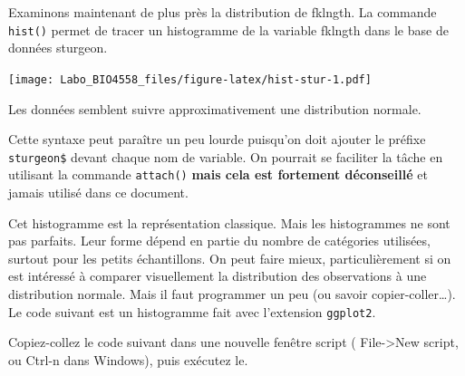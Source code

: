 \documentclass[12pt,]{book}
\makeatletter
\newenvironment{Shaded}{\begin{snugshade}}{\end{snugshade}}
\newcommand{\KeywordTok}[1]{\textcolor[rgb]{0.27,0.27,0.27}{\textbf{#1}}}
\newcommand{\NormalTok}[1]{#1}
\newcommand{\OperatorTok}[1]{\textcolor[rgb]{0.43,0.43,0.43}{\textbf{#1}}}
\newenvironment{kframe}{%
\medskip{}
\setlength{\fboxsep}{.8em}
 \def\at@end@of@kframe{}%
 \ifinner\ifhmode%
  \def\at@end@of@kframe{\end{minipage}}%
  \begin{minipage}{\columnwidth}%
 \fi\fi%
 \def\FrameCommand##1{\hskip\@totalleftmargin \hskip-\fboxsep
 \colorbox{shadecolor}{##1}\hskip-\fboxsep
     \hskip-\linewidth \hskip-\@totalleftmargin \hskip\columnwidth}%
 \MakeFramed {\advance\hsize-\width
   \@totalleftmargin\z@ \linewidth\hsize
   \@setminipage}}%
 {\par\unskip\endMakeFramed%
 \at@end@of@kframe}
\newenvironment{rmdblock}[1]
  {
  \begin{itemize}
  \renewcommand{\labelitemi}{
    \raisebox{-.7\height}[0pt][0pt]{
      {\setkeys{Gin}{width=3em,keepaspectratio}\texttt{[image: images/\#1]}}
    }
  }
  \setlength{\fboxsep}{1em}
  \begin{kframe}
  \item
  }
  {
  \end{kframe}
  \end{itemize}
  }
\newenvironment{rmdnote}
  {\begin{rmdblock}{note}}
  {\end{rmdblock}}
\newenvironment{rmdcode}
  {\begin{rmdblock}{screen}}
  {\end{rmdblock}}
\makeatother
\begin{document}
Examinons maintenant de plus près la distribution de fklngth.
La commande \texttt{hist()} permet de tracer un histogramme de la variable fklngth dans le base de données sturgeon.

\begin{Shaded}
\end{Shaded}

\texttt{[image: Labo\_BIO4558\_files/figure-latex/hist-stur-1.pdf]}

Les données semblent suivre approximativement une distribution normale.

\begin{rmdnote}
Cette syntaxe peut paraître un peu lourde puisqu'on doit ajouter le préfixe \texttt{sturgeon\$} devant chaque nom de variable.
On pourrait se faciliter la tâche en utilisant la commande \texttt{attach()} \textbf{mais cela est fortement déconseillé} et jamais utilisé dans ce document.
\end{rmdnote}

Cet histogramme est la représentation classique.
Mais les histogrammes ne sont pas parfaits.
Leur forme dépend en partie du nombre de catégories utilisées, surtout pour les petits échantillons.
On peut faire mieux, particulièrement si on est intéressé à comparer visuellement la distribution des observations à une distribution normale.
Mais il faut programmer un peu (ou savoir copier-coller\ldots{}).
Le code suivant est un histogramme fait avec l'extension \texttt{ggplot2}.

\begin{rmdcode}
Copiez-collez le code suivant dans une nouvelle fenêtre script ( File-\textgreater{}New script, ou Ctrl-n dans Windows), puis exécutez le.
\end{rmdcode}
\end{document}
